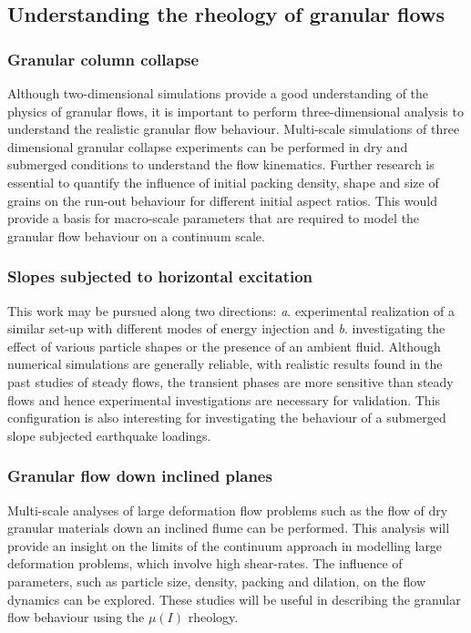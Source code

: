 \subsection{Understanding the rheology of granular flows}

\subsubsection*{Granular column collapse}
Although two-dimensional simulations provide a good understanding of the 
physics of granular flows, it is important to perform three-dimensional 
analysis to understand the realistic granular flow behaviour. Multi-scale 
simulations of three dimensional granular collapse experiments can be performed 
in dry and submerged conditions to understand the flow kinematics. Further 
research is essential to quantify the influence of initial packing density, 
shape and size of grains on the run-out behaviour for different initial aspect 
ratios. This would provide a basis for macro-scale parameters that are required 
to model the granular flow behaviour on a continuum scale.

\subsubsection*{Slopes subjected to horizontal excitation}
This work may be pursued along two directions: \textit{a}. experimental 
realization of a similar set-up with different modes of energy injection and 
\textit{b}. investigating the effect of various particle shapes or the presence 
of an ambient fluid. Although numerical simulations are generally reliable, 
with realistic results found in the past studies of steady flows, the transient 
phases are more sensitive than steady flows and hence experimental 
investigations are necessary for validation. This configuration is also 
interesting for investigating the behaviour of a submerged slope subjected 
earthquake loadings.

\subsubsection*{Granular flow down inclined planes}

Multi-scale analyses of large deformation flow problems such as the flow of dry 
granular materials down an inclined flume can be performed. This analysis will 
provide an insight on the limits of the continuum approach in modelling large 
deformation problems, which involve high shear-rates. The influence of 
parameters, such as particle size, density, packing and dilation, on the flow 
dynamics can be explored. These studies will be useful in describing the 
granular flow behaviour using the $\mu(I)$ rheology.

